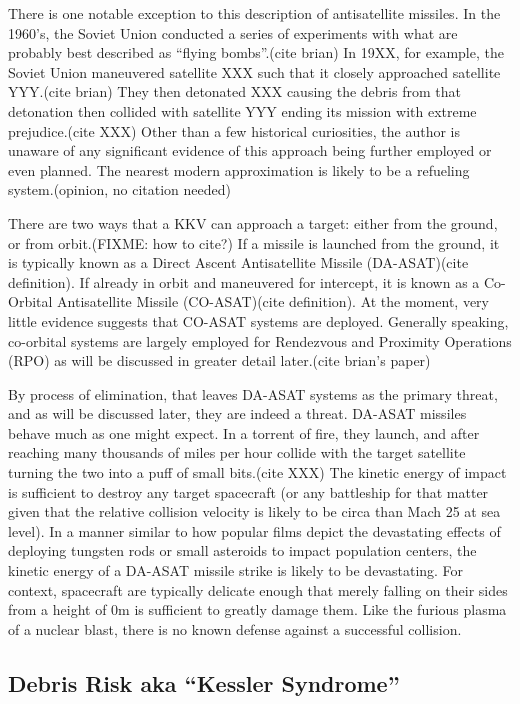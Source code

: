 There is one notable exception to this description of antisatellite
missiles.  In the 1960's, the Soviet Union conducted a series of
experiments with what are probably best described as ``flying
bombs''.(cite brian) In 19XX, for example, the Soviet Union maneuvered
satellite XXX such that it closely approached satellite YYY.(cite
brian) They then detonated XXX causing the debris from that detonation
then collided with satellite YYY ending its mission with extreme
prejudice.(cite XXX) Other than a few historical curiosities, the
author is unaware of any significant evidence of this approach being
further employed or even planned.  The nearest modern approximation is
likely to be a refueling system.(opinion, no citation needed)

There are two ways that a KKV can approach a target: either from the
ground, or from orbit.(FIXME: how to cite?)  If a missile is launched
from the ground, it is typically known as a Direct Ascent
Antisatellite Missile (DA-ASAT)(cite definition).  If already in orbit
and maneuvered for intercept, it is known as a Co-Orbital
Antisatellite Missile (CO-ASAT)(cite definition).  At the moment, very
little evidence suggests that CO-ASAT systems are deployed.  Generally
speaking, co-orbital systems are largely employed for Rendezvous and
Proximity Operations (RPO) as will be discussed in greater detail
later.(cite brian's paper)

By process of elimination, that leaves DA-ASAT systems as the primary
threat, and as will be discussed later, they are indeed a threat.
DA-ASAT missiles behave much as one might expect.  In a torrent of
fire, they launch, and after reaching many thousands of miles per hour
collide with the target satellite turning the two into a puff of small
bits.(cite XXX) The kinetic energy of impact is sufficient to destroy
any target spacecraft (or any battleship for that matter given that
the relative collision velocity is likely to be circa than Mach 25 at
sea level).  In a manner similar to how popular films depict the
devastating effects of deploying tungsten rods or small asteroids to
impact population centers, the kinetic energy of a DA-ASAT missile
strike is likely to be devastating.  For context, spacecraft are
typically delicate enough that merely falling on their sides from a
height of 0m is sufficient to greatly damage them.  Like the furious
plasma of a nuclear blast, there is no known defense against a
successful collision.

\subsection{Debris Risk aka ``Kessler Syndrome''}

